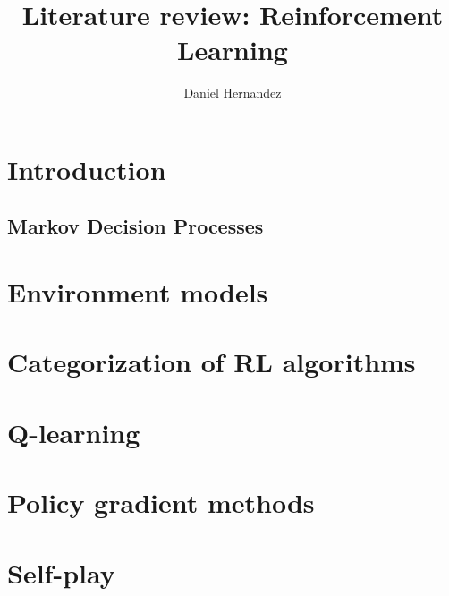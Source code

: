 \documentclass{article}
\title{\textbf{Literature review: Reinforcement Learning}}
\author{Daniel Hernandez}
\date{ }
\begin{document}
\maketitle

\tableofcontents

\newpage

\section{Introduction}


\subsection{Markov Decision Processes}\label{section:markov-decision-processes}


    
\section{Environment models}\label{section:environment-models}

    
\section{Categorization of RL algorithms}\label{section:categorization}


\section{Q-learning}\label{section:q-learning}

 
\section{Policy gradient methods}\label{section:policy-gradient-methods}

  
\section{Self-play}\label{section:self-play}

%
\end{document}
